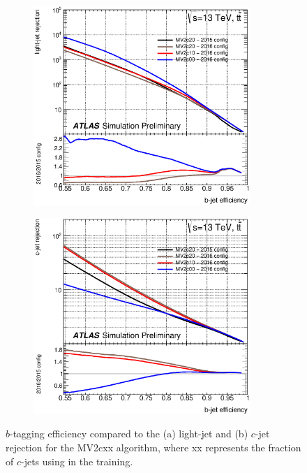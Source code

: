 \begin{figure}[h!]
\begin{subfigure}{0.5\textwidth}
  \centering
  \includegraphics[width=0.9\textwidth]{figures/Objects/btaglight.eps}
  \caption{}
  \label{}
\end{subfigure}
\begin{subfigure}{0.5\textwidth}
  \centering
  \includegraphics[width=0.9\textwidth]{figures/Objects/btagc.eps}
  \caption{}
  \label{}
\end{subfigure}
\captionsetup{width=0.85\textwidth} \caption{\small $b$-tagging efficiency compared to the (a) light-jet and (b) $c$-jet rejection for the MV2cxx algorithm, where xx represents the fraction of $c$-jets using in the training.}
\label{sec:obj:fig:mv2plot}
\end{figure}



